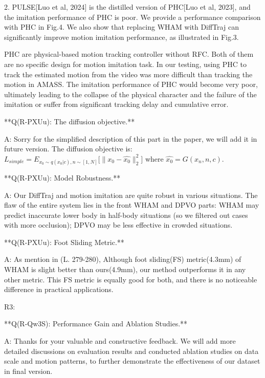 \documentclass{article}
\begin{document}
\begin{markdown}
2. PULSE[Luo et al, 2024] is the distilled version of PHC[Luo et al, 2023], and the imitation performance of PHC is poor. We provide a performance comparison with PHC in Fig.4. We also show that replacing WHAM with DiffTraj can significantly improve motion imitation performance, as illustrated in Fig.3.

PHC are physical-based motion tracking controller without RFC. Both of them are no specific design for motion imitation task. In our testing, using PHC to track the estimated motion from the video was more difficult than tracking the motion in AMASS. The imitation performance of PHC would become very poor, ultimately leading to the collapse of the physical character and the failure of the imitation or suffer from significant tracking delay and cumulative error.


**Q(R-PXUu): The diffusion objective.**

A: Sorry for the simplified description of this part in the paper, we will add it in future version. The diffusion objective is: $L_{simple} = E_{x_0 \sim q(x_0|c),n \sim [1,N]} \big[\big\|x_0-\hat{x_0}\big\|^2_2\big]$ where $\hat{x_0} = G(x_n,n,c)$. 


**Q(R-PXUu): Model Robustness.**

A: Our DiffTraj and motion imitation are quite robust in various situations. The flaw of the entire system lies in the front WHAM and DPVO parts: WHAM may predict inaccurate lower body in half-body situations (so we filtered out cases with more occlusion); DPVO may be less effective in crowded situations.

**Q(R-PXUu): Foot Sliding Metric.**

A: As mention in (L. 279-280), Although foot sliding(FS) metric(4.3mm) of WHAM is slight better than ours(4.9mm), our method outperforms it in any other metric. This FS metric is equally good for both, and there is no noticeable difference in practical applications.



R3:

**Q(R-Qw3S): Performance Gain and Ablation Studies.**

A: Thanks for your valuable and constructive feedback. We will add more detailed discussions on evaluation results and conducted ablation studies on data scale and motion patterns, to further demonstrate the effectiveness of our dataset in final version.




\end{markdown}
\end{document}
